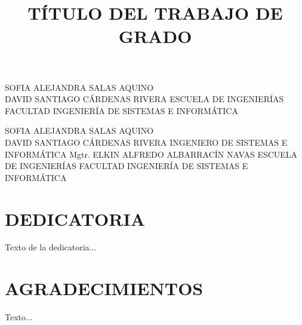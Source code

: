 \documentclass[spanish]{ieee_upb}
\title{TÍTULO DEL TRABAJO DE GRADO}
\date{\the\year}
\begin{document}
{SOFIA ALEJANDRA SALAS AQUINO \\ DAVID SANTIAGO CÁRDENAS RIVERA}
{ESCUELA DE INGENIERÍAS}
{FACULTAD INGENIERÍA DE SISTEMAS E INFORMÁTICA}

\newpage
{}
{SOFIA ALEJANDRA SALAS AQUINO \\ DAVID SANTIAGO CÁRDENAS RIVERA}
{INGENIERO DE SISTEMAS E INFORMÁTICA}
{Mgtr. ELKIN ALFREDO ALBARRACÍN NAVAS}
{ESCUELA DE INGENIERÍAS}
{FACULTAD INGENIERÍA DE SISTEMAS E INFORMÁTICA}

\newpage
\section*{DEDICATORIA}
Texto de la dedicatoria...

\clearpage
\section*{AGRADECIMIENTOS}
Texto...

\clearpage
\renewcommand\contentsname{\hfill\normalfont\bfseries CONTENIDO\hfill}
\tableofcontents

\renewcommand{\thetable}{\Roman{table}}


\makeatletter
\renewcommand{\numberline}[1]{%
  \stepcounter{tabindexcounter}%
  Tabla~\arabic{tabindexcounter}~%
}
\makeatother


\newpage
{} 
\renewcommand\listtablename{\hfill\normalfont\bfseries LISTA DE TABLAS\hfill}
\listoftables

\newpage
\renewcommand\listfigurename{\hfill\normalfont\bfseries LISTA DE FIGURAS\hfill}
\listoffigures



\end{document}
